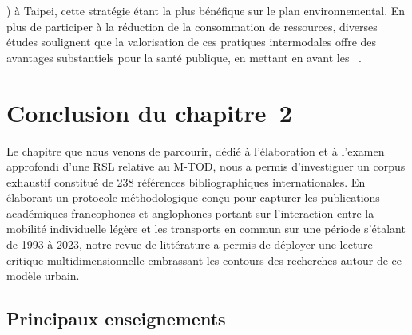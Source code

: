 \begin{refsegment}
{}) à Taipei, cette stratégie étant la plus bénéfique sur le plan environnemental. En plus de participer à la réduction de la consommation de ressources, diverses études soulignent que la valorisation de ces pratiques intermodales offre des avantages substantiels pour la santé publique, en mettant en avant les ~\textcolor{blue}{\autocites[4~270]{bopp_examining_2015}[2~738]{papon_evaluation_2017}[8]{adnan_last-mile_2019}}.%

    \newpage
\section*{Conclusion du chapitre~2
    \label{chap2:conclusion}
    }
    
Le chapitre que nous venons de parcourir, dédié à l'élaboration et à l'examen approfondi d'une \acrshort{RSL} relative au \acrshort{M-TOD}, nous a permis d'investiguer un corpus exhaustif constitué de 238 références bibliographiques internationales. En élaborant un protocole méthodologique conçu pour capturer les publications académiques francophones et anglophones portant sur l'interaction entre la mobilité individuelle légère et les transports en commun sur une période s'étalant de 1993 à 2023, notre revue de littérature a permis de déployer une lecture critique multidimensionnelle embrassant les contours des recherches autour de ce modèle urbain.%

\subsection*{Principaux enseignements
    \label{chap2:principaux-enseignements}
    }
    

\end{refsegment}
